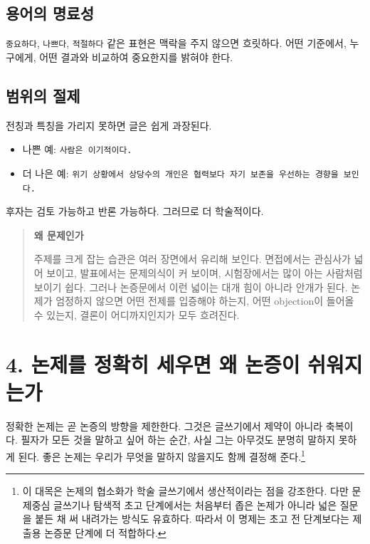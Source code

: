 \subsection{용어의 명료성}\label{uxc6a9uxc5b4uxc758-uxba85uxb8ccuxc131}

\texttt{중요하다}, \texttt{나쁘다}, \texttt{적절하다} 같은 표현은 맥락을 주지 않으면 흐릿하다. 어떤 기준에서, 누구에게, 어떤 결과와 비교하여 중요한지를 밝혀야 한다.

\subsection{범위의 절제}\label{uxbc94uxc704uxc758-uxc808uxc81c}

전칭과 특칭을 가리지 못하면 글은 쉽게 과장된다.

\begin{itemize}
\tightlist
\item
  나쁜 예: \texttt{사람은\ 이기적이다.}
\item
  더 나은 예: \texttt{위기\ 상황에서\ 상당수의\ 개인은\ 협력보다\ 자기\ 보존을\ 우선하는\ 경향을\ 보인다.}
\end{itemize}

후자는 검토 가능하고 반론 가능하다. 그러므로 더 학술적이다.

\begin{quote}
\textbf{왜 문제인가}

주제를 크게 잡는 습관은 여러 장면에서 유리해 보인다. 면접에서는 관심사가 넓어 보이고, 발표에서는 문제의식이 커 보이며, 시험장에서는 많이 아는 사람처럼 보이기 쉽다. 그러나 논증문에서 이런 넓이는 대개 힘이 아니라 안개가 된다. 논제가 엄정하지 않으면 어떤 전제를 입증해야 하는지, 어떤 objection이 들어올 수 있는지, 결론이 어디까지인지가 모두 흐려진다.
\end{quote}

\section{4. 논제를 정확히 세우면 왜 논증이 쉬워지는가}\label{4-uxb17cuxc81cuxb97c-uxc815uxd655uxd788-uxc138uxc6b0uxba74-uxc65c-uxb17cuxc99duxc774-uxc26cuxc6ccuxc9c0uxb294uxac00}

정확한 논제는 곧 논증의 방향을 제한한다. 그것은 글쓰기에서 제약이 아니라 축복이다. 필자가 모든 것을 말하고 싶어 하는 순간, 사실 그는 아무것도 분명히 말하지 못하게 된다. 좋은 논제는 우리가 무엇을 말하지 않을지도 함께 결정해 준다.\footnote{이 대목은 논제의 협소화가 학술 글쓰기에서 생산적이라는 점을 강조한다. 다만 문제중심 글쓰기나 탐색적 초고 단계에서는 처음부터 좁은 논제가 아니라 넓은 질문을 붙든 채 써 내려가는 방식도 유효하다. 따라서 이 명제는 초고 전 단계보다는 제출용 논증문 단계에 더 적합하다.}

